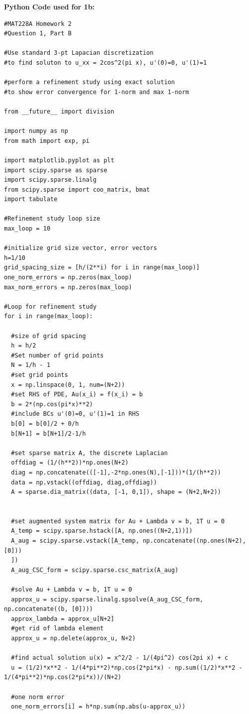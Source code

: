 \documentclass[12pt]{article}
\begin{document}
\noindent \textbf{Python Code used for 1b:}
\begin{verbatim}
#MAT228A Homework 2
#Question 1, Part B

#Use standard 3-pt Lapacian discretization 
#to find soluton to u_xx = 2cos^2(pi x), u'(0)=0, u'(1)=1

#perform a refinement study using exact solution
#to show error convergence for 1-norm and max 1-norm

from __future__ import division

import numpy as np
from math import exp, pi

import matplotlib.pyplot as plt
import scipy.sparse as sparse
import scipy.sparse.linalg
from scipy.sparse import coo_matrix, bmat
import tabulate

#Refinement study loop size
max_loop = 10

#initialize grid size vector, error vectors
h=1/10
grid_spacing_size = [h/(2**i) for i in range(max_loop)]
one_norm_errors = np.zeros(max_loop)
max_norm_errors = np.zeros(max_loop)

#Loop for refinement study
for i in range(max_loop):

  #size of grid spacing
  h = h/2
  #Set number of grid points
  N = 1/h - 1
  #set grid points
  x = np.linspace(0, 1, num=(N+2))
  #set RHS of PDE, Au(x_i) = f(x_i) = b
  b = 2*(np.cos(pi*x)**2)
  #include BCs u'(0)=0, u'(1)=1 in RHS
  b[0] = b[0]/2 + 0/h
  b[N+1] = b[N+1]/2-1/h

  #set sparse matrix A, the discrete Laplacian
  offdiag = (1/(h**2))*np.ones(N+2)
  diag = np.concatenate(([-1],-2*np.ones(N),[-1]))*(1/(h**2))
  data = np.vstack((offdiag, diag,offdiag))
  A = sparse.dia_matrix((data, [-1, 0,1]), shape = (N+2,N+2))


  #set augmented system matrix for Au + Lambda v = b, 1T u = 0
  A_temp = scipy.sparse.hstack([A, np.ones((N+2,1))])
  A_aug = scipy.sparse.vstack([A_temp, np.concatenate((np.ones(N+2), [0]))
  ])
  A_aug_CSC_form = scipy.sparse.csc_matrix(A_aug)

  #solve Au + Lambda v = b, 1T u = 0
  approx_u = scipy.sparse.linalg.spsolve(A_aug_CSC_form, np.concatenate((b, [0])))
  approx_lambda = approx_u[N+2]
  #get rid of lambda element
  approx_u = np.delete(approx_u, N+2) 
  
  #find actual solution u(x) = x^2/2 - 1/(4pi^2) cos(2pi x) + c
  u = (1/2)*x**2 - 1/(4*pi**2)*np.cos(2*pi*x) - np.sum((1/2)*x**2 - 1/(4*pi**2)*np.cos(2*pi*x))/(N+2)
  
  #one norm error
  one_norm_errors[i] = h*np.sum(np.abs(u-approx_u))


\end{verbatim}
\end{document}
